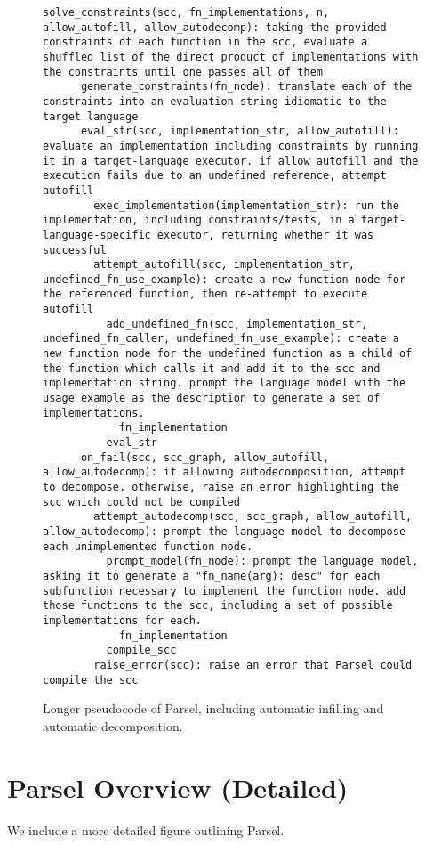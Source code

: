 \begin{figure*}[h]
\begin{lstlisting}[basicstyle=\fontsize{6}{8}\selectfont\ttfamily]
    solve_constraints(scc, fn_implementations, n, allow_autofill, allow_autodecomp): taking the provided constraints of each function in the scc, evaluate a shuffled list of the direct product of implementations with the constraints until one passes all of them
      generate_constraints(fn_node): translate each of the constraints into an evaluation string idiomatic to the target language
      eval_str(scc, implementation_str, allow_autofill): evaluate an implementation including constraints by running it in a target-language executor. if allow_autofill and the execution fails due to an undefined reference, attempt autofill
        exec_implementation(implementation_str): run the implementation, including constraints/tests, in a target-language-specific executor, returning whether it was successful
        attempt_autofill(scc, implementation_str, undefined_fn_use_example): create a new function node for the referenced function, then re-attempt to execute autofill
          add_undefined_fn(scc, implementation_str, undefined_fn_caller, undefined_fn_use_example): create a new function node for the undefined function as a child of the function which calls it and add it to the scc and implementation string. prompt the language model with the usage example as the description to generate a set of implementations.
            fn_implementation
          eval_str
      on_fail(scc, scc_graph, allow_autofill, allow_autodecomp): if allowing autodecomposition, attempt to decompose. otherwise, raise an error highlighting the scc which could not be compiled
        attempt_autodecomp(scc, scc_graph, allow_autofill, allow_autodecomp): prompt the language model to decompose each unimplemented function node.
          prompt_model(fn_node): prompt the language model, asking it to generate a "fn_name(arg): desc" for each subfunction necessary to implement the function node. add those functions to the scc, including a set of possible implementations for each.
            fn_implementation
          compile_scc
        raise_error(scc): raise an error that Parsel could compile the scc
\end{lstlisting}
\caption{Longer pseudocode of Parsel, including automatic infilling and automatic decomposition.}
\label{fig:parselpseudo}
\end{figure*}

\clearpage
\newpage

\section{Parsel Overview (Detailed)}
\label{parseldetailed}
We include a more detailed figure outlining Parsel.

